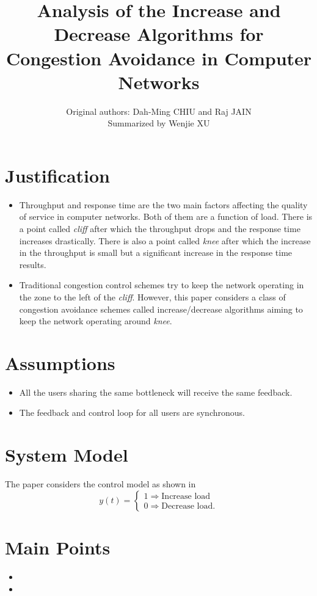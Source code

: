\documentclass[a4paper]{article}
\title{Analysis of the Increase and Decrease Algorithms for Congestion Avoidance in Computer Networks}
\author{Original authors: Dah-Ming CHIU and Raj JAIN\\Summarized by Wenjie XU}
\begin{document}
    \maketitle
    \section{Justification}
    \begin{itemize}
      \item Throughput and response time are the two main factors affecting the quality of service in computer networks. Both of them are a function of load. There is a point called \textsl{cliff} after which the throughput drops and the response time increases drastically. There is also a point called \textsl{knee} after which the increase in the throughput is small but a significant increase in the response time results.    
      \item Traditional congestion control schemes try to keep the network operating in the zone to the left of the \textsl{cliff}. However, this paper considers a class of congestion avoidance schemes called increase/decrease algorithms aiming to keep the network operating around \textsl{knee}.   
    \end{itemize}
    
    \section{Assumptions}
    \begin{itemize} 
    \item All the users sharing the same bottleneck will receive the same feedback.
    \item The feedback and control loop for all users are synchronous.
    \end{itemize} 
    
    \section{System Model}
    The paper considers the control model as shown in 
    \[
        y(t)=\left\{
                    \begin{array}{ll}
                      1\Longrightarrow \textrm{Increase load}\\
                      0\Longrightarrow \textrm{Decrease load}.
                    \end{array}
                  \right.
      \]
    
    \section{Main Points}
    \begin{itemize}
      \item 
      \item 
    \end{itemize}
    
\end{document}
